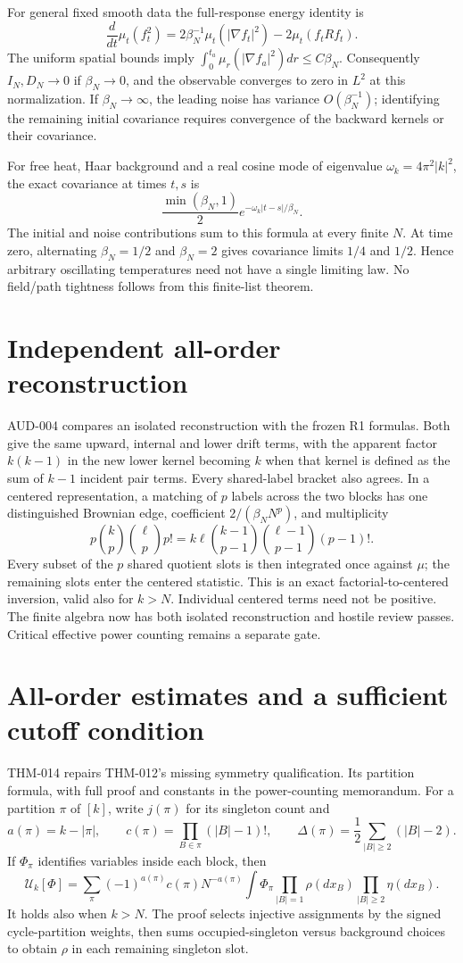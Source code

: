 \documentclass[11pt]{article}
\newcommand{\U}{\mathcal U}
\begin{document}
For general fixed smooth data the full-response energy identity is
\[
 \frac d{dt}\mu_t(f_t^2)
 =2\beta_N^{-1}\mu_t(|\nabla f_t|^2)-2\mu_t(f_tRf_t).
\]
The uniform spatial bounds imply
$\int_0^{t_a}\mu_r(|\nabla f_a|^2)dr\le C\beta_N$.
Consequently $I_N,D_N\to0$ if $\beta_N\to0$, and the observable converges
to zero in $L^2$ at this normalization. If $\beta_N\to\infty$, the leading
noise has variance $O(\beta_N^{-1})$; identifying the remaining initial
covariance requires convergence of the backward kernels or their covariance.

For free heat, Haar background and a real cosine mode of eigenvalue
$\omega_k=4\pi^2|k|^2$, the exact covariance at times $t,s$ is
\[
 \frac{\min(\beta_N,1)}2
        e^{-\omega_k|t-s|/\beta_N}.
\]
The initial and noise contributions sum to this formula at every finite
$N$. At time zero, alternating $\beta_N=1/2$ and $\beta_N=2$ gives covariance
limits $1/4$ and $1/2$. Hence arbitrary oscillating temperatures need not
have a single limiting law. No field/path tightness follows from this
finite-list theorem.

\section{Independent all-order reconstruction}
AUD-004 compares an isolated reconstruction with the frozen R1 formulas.
Both give the same upward, internal and lower drift terms, with the apparent
factor $k(k-1)$ in the new lower kernel becoming $k$ when that kernel is
defined as the sum of $k-1$ incident pair terms. Every shared-label bracket
also agrees. In a centered representation, a matching of $p$ labels across
the two blocks has one distinguished Brownian edge, coefficient
$2/(\beta_NN^p)$, and multiplicity
\[
 p\binom{k}{p}\binom{\ell}{p}p!
 =k\ell\binom{k-1}{p-1}\binom{\ell-1}{p-1}(p-1)!.
\]
Every subset of the $p$ shared quotient slots is then integrated once against
$\mu$; the remaining slots enter the centered statistic. This is an exact
factorial-to-centered inversion, valid also for $k>N$. Individual centered
terms need not be positive. The finite algebra now has both isolated
reconstruction and hostile review passes. Critical effective power counting
remains a separate gate.

\section{All-order estimates and a sufficient cutoff condition}
THM-014 repairs THM-012's missing symmetry qualification. Its partition formula,
with full proof and constants
in the power-counting memorandum. For a partition $\pi$ of $[k]$, write
$j(\pi)$ for its singleton count and
\[
 a(\pi)=k-|\pi|,\qquad c(\pi)=\prod_{B\in\pi}(|B|-1)!,\qquad
 \Delta(\pi)=\frac12\sum_{|B|\ge2}(|B|-2).
\]
If $\Phi_\pi$ identifies variables inside each block, then
\[
 \U_k[\Phi]=\sum_{\pi}(-1)^{a(\pi)}c(\pi)N^{-a(\pi)}
 \int\Phi_\pi\prod_{|B|=1}\rho(dx_B)\prod_{|B|\ge2}\eta(dx_B).
\]
It holds also when $k>N$. The proof selects injective assignments by the
signed cycle-partition weights, then sums occupied-singleton versus background
choices to obtain $\rho$ in each remaining singleton slot.
\end{document}
